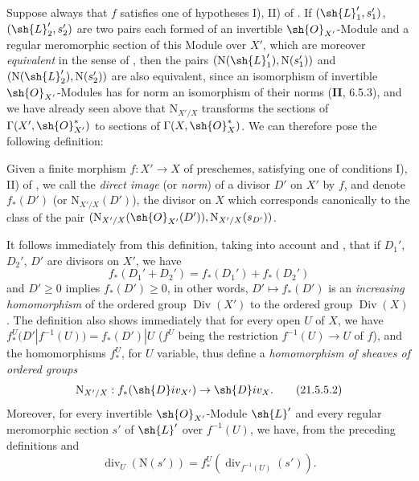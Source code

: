\begin{env}[21.5.4]
\label{IV.21.5.4}
Suppose always that $f$ satisfies one of hypotheses I), II) of .
If $(\sh{L}_1',s_1')$, $(\sh{L}_2',s_2')$ are two pairs each formed of an invertible $\sh{O}_{X'}$-Module and a regular meromorphic section of this Module over $X'$, which are moreover \emph{equivalent} in the sense of , then the pairs $(\mathrm{N}(\sh{L}_1'),\mathrm{N}(s_1'))$ and $(\mathrm{N}(\sh{L}_2'),\mathrm{N}(s_2'))$ are also equivalent, since an isomorphism of invertible $\sh{O}_{X'}$-Modules has for norm an isomorphism of their norms (\textbf{II}, 6.5.3), and we have already seen above that $\mathrm{N}_{X'/X}$ transforms the sections of $\Gamma(X',\sh{O}_{X'}^*)$ to sections of $\Gamma(X,\sh{O}_X^*)$.
We can therefore pose the following definition:
\end{env}


\begin{definition}[21.5.5]
\label{IV.21.5.5}
Given a finite morphism $f:X'\to X$ of preschemes, satisfying one of conditions I), II) of , we call the \emph{direct image} (or \emph{norm}) of a divisor $D'$ on $X'$ by $f$, and denote $f_*(D')$ (or $\mathrm{N}_{X'/X}(D')$), the divisor on $X$ which corresponds canonically  to the class of the pair $(\mathrm{N}_{X'/X}(\sh{O}_{X'}(D')),\mathrm{N}_{X'/X}(s_{D'}))$.
\end{definition}

It follows immediately from this definition, taking into account  and , that if $D_1'$, $D_2'$, $D'$ are divisors on $X'$, we have
\[
\label{IV.21.5.5.1}
  f_*(D_1'+D_2')=f_*(D_1')+f_*(D_2')
  \tag{21.5.5.1}
\]
and $D'\geq 0$ implies $f_*(D')\geq 0$, in other words, $D'\mapsto f_*(D')$ is an \emph{increasing homomorphism} of the ordered group $\operatorname{Div}(X')$ to the ordered group $\operatorname{Div}(X)$.
The definition  also shows immediately that for every open $U$ of $X$, we have $f_*^U(D'|f^{-1}(U))=f_*(D')|U$ ($f^U$ being the restriction $f^{-1}(U)\to U$ of $f$), and the homomorphisms $f_*^U$, for $U$ variable, thus define a \emph{homomorphism of sheaves of ordered groups}
\[
\label{IV.21.5.5.2}
  \mathrm{N}_{X'/X}:f_*(\sh{D}iv_{X'})\to\sh{D}iv_X.
  \tag{21.5.5.2}
\]
Moreover, for every invertible $\sh{O}_{X'}$-Module $\sh{L}'$ and every regular meromorphic section $s'$ of $\sh{L}'$ over $f^{-1}(U)$, we have, from the preceding definitions and 
\[
\label{IV.21.5.5.3}
  \operatorname{div}_U(\mathrm{N}(s'))=f_*^U(\operatorname{div}_{f^{-1}(U)}(s')).
  \tag{21.5.5.3}
\]

